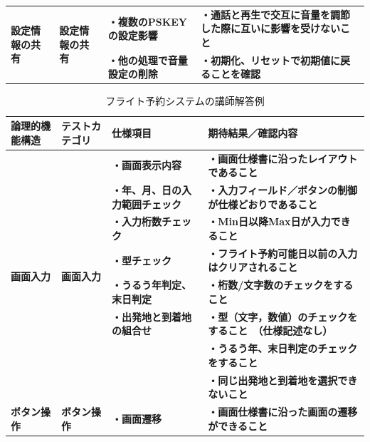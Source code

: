 \begin{table}[htbp]
\begin{tabular}{|l|l|p{13em}|p{18em}|}
    \hline
    \multicolumn{1}{|l|}{\multirow{2}[2]{*}{\textbf{設定情報の共有}}} & \multicolumn{1}{l|}{\multirow{2}[2]{*}{\textbf{設定情報の共有}}} & \textbf{・複数のPSKEYの設定影響} & \textbf{・通話と再生で交互に音量を調節した際に互いに影響を受けないこと} \bigstrut[t]\\
          &       & \textbf{・他の処理で音量設定の削除} & \textbf{・初期化、リセットで初期値に戻ることを確認} \bigstrut[b]\\
    \hline
    \end{tabular}%
  \label{tab:D-3-ensyu1}%
\end{table}%

\begin{table}[htbp]
  \scriptsize
  \centering
  \caption{フライト予約システムの講師解答例}
  \begin{tabular}{|l|l|p{13em}|p{18em}|}
  \hline
    \multicolumn{1}{|p{8.665em}|}{\textbf{論理的機能構造}} & \multicolumn{1}{p{14.085em}|}{\textbf{テストカテゴリ}} & \textbf{仕様項目} & \textbf{期待結果／確認内容} \bigstrut\\
    \hline
    \multicolumn{1}{|l|}{\multirow{8}[2]{*}{\textbf{画面入力}}} & \multicolumn{1}{l|}{\multirow{8}[2]{*}{\textbf{画面入力}}} & \textbf{・画面表示内容} & \textbf{・画面仕様書に沿ったレイアウトであること} \bigstrut[t]\\
          &       & \textbf{・年、月、日の入力範囲チェック} & \textbf{・入力フィールド／ボタンの制御が仕様どおりであること} \\
          &       & \textbf{・入力桁数チェック} & \textbf{・Min日以降Max日が入力できること} \\
          &       & \textbf{・型チェック} & \textbf{・フライト予約可能日以前の入力はクリアされること} \\
          &       & \textbf{・うるう年判定、末日判定} & \textbf{・桁数/文字数のチェックをすること} \\
          &       & \textbf{・出発地と到着地の組合せ} & \textbf{・型（文字，数値）のチェックをすること　（仕様記述なし）} \\
          &       & \multicolumn{1}{r|}{} & \textbf{・うるう年、末日判定のチェックをすること} \\
          &       & \multicolumn{1}{r|}{} & \textbf{・同じ出発地と到着地を選択できないこと} \bigstrut[b]\\
    \hline
    \multicolumn{1}{|p{8.665em}|}{\textbf{ボタン操作}} & \multicolumn{1}{p{14.085em}|}{\textbf{ボタン操作}} & \textbf{・画面遷移} & \textbf{・画面仕様書に沿った画面の遷移ができること} \bigstrut\\

\end{tabular}
\end{table}
